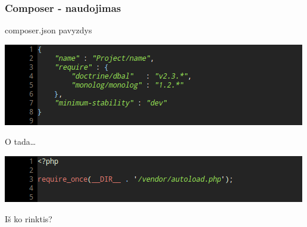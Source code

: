 \documentclass[12pt,a4paper]{beamer}
\begin{document}
\begin{frame}
    \frametitle{Composer - naudojimas}

    composer.json pavyzdys
    \begin{center}
        \includegraphics[scale=0.5]{img/composer_json.png}
    \end{center}
    \pause
    O tada\dots\\
    \begin{center}
        \includegraphics[scale=0.5]{img/autoload.png}
    \end{center}
\end{frame}

\begin{frame}[fragile]

    {\Huge Iš ko rinktis?}
\end{frame}
\end{document}
